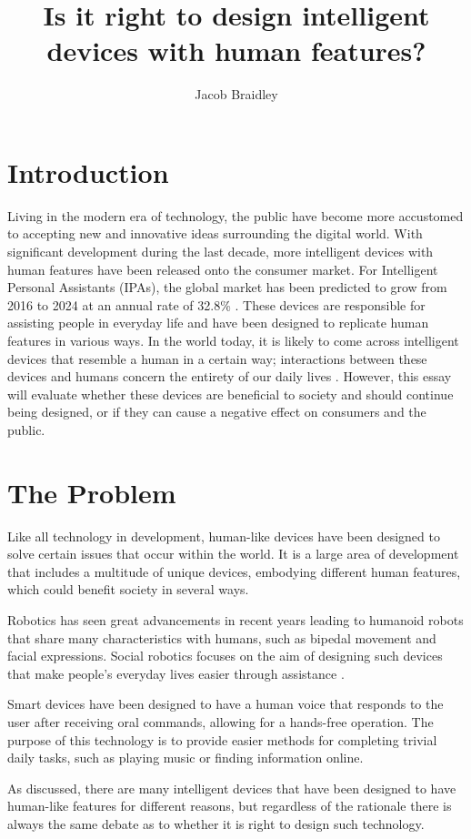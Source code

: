 \documentclass{article}
\title{Is it right to design intelligent devices with human features?}
\author{Jacob Braidley}
\date{}
\begin{document}
\maketitle

\vspace{0.5cm}

\section{Introduction}
Living in the modern era of technology, the public have become more accustomed to accepting new and innovative ideas surrounding the digital world. With significant development during the last decade, more intelligent devices with human features have been released onto the consumer market. For Intelligent Personal Assistants (IPAs), the global market has been predicted to grow from 2016 to 2024 at an annual rate of 32.8\% \cite{tmr2016market}. These devices are responsible for assisting people in everyday life and have been designed to replicate human features in various ways. In the world today, it is likely to come across intelligent devices that resemble a human in a certain way; interactions between these devices and humans concern the entirety of our daily lives \cite{securityTech2022interactions}. However, this essay will evaluate whether these devices are beneficial to society and should continue being designed, or if they can cause a negative effect on consumers and the public.

\section{The Problem}
Like all technology in development, human-like devices have been designed to solve certain issues that occur within the world. It is a large area of development that includes a multitude of unique devices, embodying different human features, which could benefit society in several ways.\par
Robotics has seen great advancements in recent years leading to humanoid robots that share many characteristics with humans, such as bipedal movement and facial expressions. Social robotics focuses on the aim of designing such devices that make people’s everyday lives easier through assistance \cite{wykowska2014social}.\par
Smart devices have been designed to have a human voice that responds to the user after receiving oral commands, allowing for a hands-free operation. The purpose of this technology is to provide easier methods for completing trivial daily tasks, such as playing music or finding information online.\par
As discussed, there are many intelligent devices that have been designed to have human-like features for different reasons, but regardless of the rationale there is always the same debate as to whether it is right to design such technology.
\end{document}
